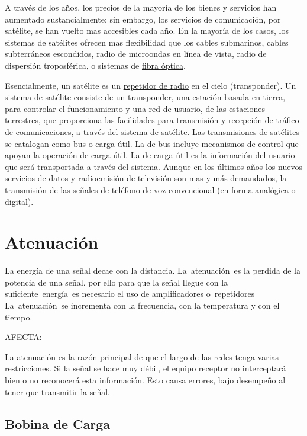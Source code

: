 \documentclass[a4paper]{article}
\begin{document}
A través de los años, los precios de la mayoría de los bienes y
servicios han aumentado sustancialmente; sin embargo, los servicios de
comunicación, por satélite, se han vuelto mas accesibles cada año. En la
mayoría de los casos, los sistemas de satélites ofrecen mas flexibilidad
que los cables submarinos, cables subterráneos escondidos, radio de
microondas en línea de vista, radio de dispersión troposférica, o
sistemas de \href{https://www.ecured.cu/Fibra_\%C3\%B3ptica}{fibra
óptica}.

Esencialmente, un satélite es
un \href{https://www.ecured.cu/index.php?title=Repetidor_de_radio\&action=edit\&redlink=1}{repetidor
de radio} en el cielo (transponder). Un sistema de satélite consiste de
un transponder, una estación basada en tierra, para controlar el
funcionamiento y una red de usuario, de las estaciones terrestres, que
proporciona las facilidades para transmisión y recepción de tráfico de
comunicaciones, a través del sistema de satélite. Las transmisiones de
satélites se catalogan como bus o carga útil. La de bus incluye
mecanismos de control que apoyan la operación de carga útil. La de carga
útil es la información del usuario que será transportada a través del
sistema. Aunque en los últimos años los nuevos servicios de datos
y \href{https://www.ecured.cu/index.php?title=Radioemisi\%C3\%B3n_de_televisi\%C3\%B3n\&action=edit\&redlink=1}{radioemisión
de televisión} son mas y más demandados, la transmisión de las señales
de teléfono de voz convencional (en forma analógica o digital).

\section{Atenuaci\'on}

La energía de una señal decae con la distancia. La~atenuación~es la
perdida de la potencia de una señal. por ello para que la señal llegue
con la suficiente~energía~es necesario el uso de amplificadores
o~repetidores~~ La~atenuación~se incrementa con la frecuencia, con la
temperatura y con el tiempo.

AFECTA:

La atenuación es la razón principal de que el largo de las redes tenga
varias restricciones. Si la señal se hace muy débil, el equipo receptor
no interceptará bien o no reconocerá esta información. Esto causa
errores, bajo desempeño al tener que transmitir la señal.

\subsection{Bobina de Carga}
\end{document}
